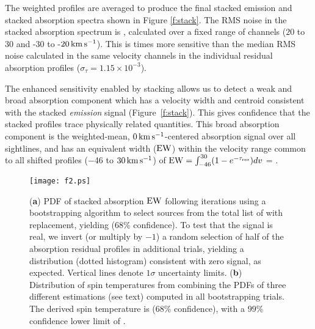 \documentclass{aastex}
\begin{document}
The weighted profiles are averaged to produce the final stacked emission 
and stacked absorption spectra shown in Figure \ref{f:stack}.  The RMS 
noise in the stacked absorption spectrum is  \RmsStack{}, calculated over a fixed range of channels 
($20$ to $30$ and -$30$ to -$20\rm\,km\,s^{-1}$). This is \TimesBetter{} times more 
sensitive than the median RMS noise calculated in the same 
velocity channels in the individual residual absorption 
profiles ($\sigma_{\tau}=1.15\times10^{-3}$).

The enhanced sensitivity enabled by stacking allows 
us to detect a weak and broad absorption component which has 
a velocity width and centroid consistent with the 
stacked {\em emission} signal (Figure~\ref{f:stack}). This 
gives confidence that the stacked profiles trace physically 
related quantities. This broad absorption component is 
the weighted-mean, $0\,\rm km\,s^{-1}$-centered absorption signal 
over all sightlines, and has an equivalent width ($\rm EW$) 
within the velocity range common to all shifted profiles 
($-$46 to $30\rm\,km\,s^{-1}$) of 
${\rm EW}=\int_{-46}^{30} (1-e^{-\tau_{\rm res}}) d v$ = \EW{}. 

\begin{figure*}
    \centering
    \texttt{[image: f2.ps]}
    \caption{(\textbf{a}) PDF of stacked absorption 
         $\rm EW$ following \NoIterations{} iterations using a 
         bootstrapping algorithm to select \NoOfKeeps{} sources 
         from the  total list of \NoOfKeeps{} with replacement, 
         yielding \MonteCarloEW{} ($68$\% confidence). To test 
         that the signal is real, we invert (or multiply by $-1$) 
         a random selection of half of the absorption residual 
         profiles in \NoIterations{} additional trials, yielding 
         a distribution (dotted histogram) consistent with zero 
         signal, as expected. Vertical lines denote $1\sigma$ 
         uncertainty limits. (\textbf{b}) Distribution of spin 
         temperatures from combining the PDFs of three different 
         estimations (see text) computed in all \NoIterations{} 
         bootstrapping trials.  The derived spin temperature is 
         \StackedSpinTemp{} ($68$\% confidence), with a $99\%$ 
         confidence lower limit of \LowLimit{}.
         }
    \label{f:histo}
\end{figure*}
\end{document}
